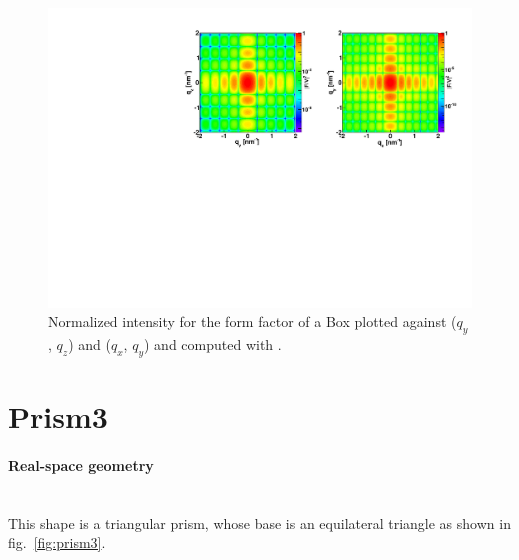 \begin{figure}[ht]
\begin{center}
\includegraphics[angle=-90,width=\textwidth]{Figures/ff/figffbox.pdf}
\end{center}
\caption{Normalized intensity for the form factor of a Box plotted against ($q_y$, $q_z$) and  ($q_x$, $q_y$) and computed with .}
\label{fig:FFBoxEx}
\end{figure}

\FloatBarrier

\newpage
\section{Prism3}  

\paragraph{Real-space geometry}\mbox{}\\
This shape is a triangular prism, whose base is an equilateral
triangle as shown in fig.~\ref{fig:prism3}.

